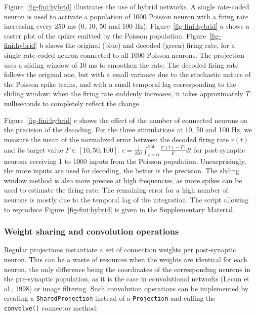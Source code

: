 \documentclass[
  11pt,
  a4paper,
]{scrbook}
\begin{document}
Figure~\ref{fig-fini:hybrid} illustrates the use of hybrid networks. A
single rate-coded neuron is used to activate a population of 1000
Poisson neuron with a firing rate increasing every 250 ms (0, 10, 50 and
100 Hz). Figure~\ref{fig-fini:hybrid} a shows a raster plot of the
spikes emitted by the Poisson population. Figure~\ref{fig-fini:hybrid} b
shows the original (blue) and decoded (green) firing rate, for a single
rate-coded neuron connected to all 1000 Poisson neurons. The projection
uses a sliding window of 10 ms to smoothen the rate. The decoded firing
rate follows the original one, but with a small variance due to the
stochastic nature of the Poisson spike trains, and with a small temporal
lag corresponding to the sliding window: when the firing rate suddenly
increases, it takes approximately \(T\) milliseconds to completely
reflect the change.

Figure~\ref{fig-fini:hybrid} c shows the effect of the number of
connected neurons on the precision of the decoding. For the three
stimulations at 10, 50 and 100 Hz, we measure the mean of the normalized
error between the decoded firing rate \(r(t)\) and its target value
\(F \in [10, 50, 100]\):
\(\epsilon = \frac{1}{250} \int_{t=0}^{250} \frac{|r(t) - F|}{F} dt\)
for post-synaptic neurons receiving 1 to 1000 inputs from the Poisson
population. Unsurprisingly, the more inputs are used for decoding, the
better is the precision. The sliding window method is also more precise
at high frequencies, as more spikes can be used to estimate the firing
rate. The remaining error for a high number of neurons is mostly due to
the temporal lag of the integration. The script allowing to reproduce
Figure~\ref{fig-fini:hybrid} is given in the Supplementary Material.

\subsubsection*{Weight sharing and convolution
operations}\label{weight-sharing-and-convolution-operations}

Regular projections instantiate a set of connection weights per
post-synaptic neuron. This can be a waste of resources when the weights
are identical for each neuron, the only difference being the coordinates
of the corresponding neurons in the pre-synaptic population, as it is
the case in convolutional networks (Lecun et al., 1998) or image
filtering. Such convolution operations can be implemented by creating a
\texttt{SharedProjection} instead of a \texttt{Projection} and calling
the \texttt{convolve()} connector method:
\end{document}

